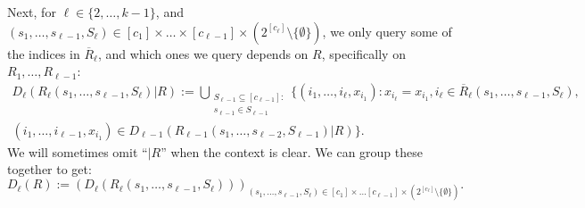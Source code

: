 \documentclass{article}
\renewcommand{\>}{\rangle}
\newcommand{\<}{\langle}
\renewcommand{\(}{\left(}
\renewcommand{\)}{\right)}
\begin{document}
Next, for $\ell\in \{2,\dots,k-1\}$, and $(s_1,\dots,s_{\ell-1},S_{\ell})\in [c_1]\times\dots\times [c_{\ell-1}]\times (2^{[c_{\ell}]}\setminus\{\emptyset\})$, we only query some of the indices in $\overline{R}_{\ell}$, and which ones we query depends on $R$, specifically on $R_1,\dots,R_{\ell-1}$:
\begin{multline}
D_{\ell}(R_{\ell}(s_1,\dots,s_{\ell-1},S_{\ell})|R) := \bigcup_{\substack{S_{\ell-1}\subseteq [c_{\ell-1}]:\\ s_{\ell-1}\in S_{\ell-1}}}
\big\{  
(i_1,\dots,i_{\ell},x_{i_1}):x_{i_{\ell}}=x_{i_1},i_{\ell}\in \overline{R}_{\ell}(s_1,\dots,s_{\ell-1},S_{\ell}),\\
 (i_1,\dots,i_{\ell-1},x_{i_1})\in D_{\ell-1}(R_{\ell-1}(s_1,\dots,s_{\ell-2},S_{\ell-1})|R)  
\big\}.
\label{eq:D-ell}
\end{multline}
We will sometimes omit ``$|R$'' when the context is clear. We can group these together to get:
\begin{equation}
D_{\ell}(R) := \left(D_{\ell}(R_{\ell}(s_1,\dots,s_{\ell-1},S_{\ell}))\right)_{(s_1,\dots,s_{\ell-1},S_{\ell})\in [c_1]\times\dots[c_{\ell-1}]\times (2^{[c_{\ell}]}\setminus\{\emptyset\})}.\label{eq:D-ell-R}
\end{equation}
\end{document}
